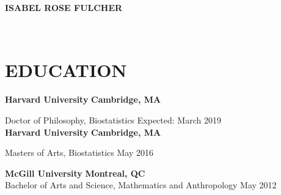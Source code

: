 \documentclass[12pt]{article}
\begin{document}
\newcommand{\MYhref}[3][blue]{\href{#2}{\color{#1}{#3}}}%
\begin{center}
	\textbf{
			{\huge I}{\Large SABEL} \hspace{-0.1em} 
			{\huge R}{\Large OSE} \hspace{-0.1em} 
			{\huge F}{\Large ULCHER}}\\
\end{center}
\begin{minipage}[t]{0.5\linewidth}
\begin{flushleft}
	\MYhref[black]{mailto:isabelfulcher@g.harvard.edu}{isabelfulcher@g.harvard.edu} \\
	\MYhref[black]{http://orcid.org/0000-0002-1209-824X}{ORCID: 0000-0002-1209-824X} 
\end{flushleft}
\end{minipage}
\begin{minipage}[t]{0.5\linewidth} 
\end{minipage}

\section*{\textbf{{\large E}DUCATION}}

\textbf{Harvard University} \hfill \hfill \textbf{Cambridge, MA}

Doctor of Philosophy, Biostatistics \hfill \hfill Expected: March 2019 \\

\textbf{Harvard University} \hfill \hfill \textbf{Cambridge, MA}

Masters of Arts, Biostatistics \hfill \hfill May 2016

\vspace{.5cm}

\textbf{McGill University} \hfill \hfill \textbf{Montreal, QC} \\
Bachelor of Arts and Science, Mathematics and Anthropology  \hfill \hfill May 2012 
\end{document}
